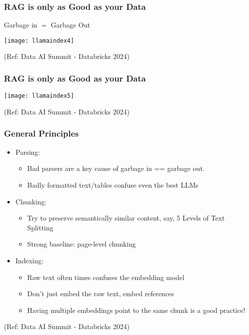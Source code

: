 \begin{frame}[fragile]\frametitle{RAG is only as Good as your Data}

Garbage in $=$ Garbage Out

\begin{center}
\texttt{[image: llamaindex4]}

{\tiny (Ref: Data AI Summit - Databricks 2024)}
\end{center}
\end{frame}


\begin{frame}[fragile]\frametitle{RAG is only as Good as your Data}


\begin{center}
\texttt{[image: llamaindex5]}

{\tiny (Ref: Data AI Summit - Databricks 2024)}
\end{center}
\end{frame}


\begin{frame}[fragile]\frametitle{General Principles}


\begin{itemize}
\item Parsing:
	\begin{itemize}
	\item Bad parsers are a key cause of garbage in == garbage out.
	\item Badly formatted text/tables confuse even the best LLMs
	\end{itemize}	
\item Chunking: 
	\begin{itemize}
	\item Try to preserve semantically similar content, say, 5 Levels of Text Splitting
	\item Strong baseline: page-level chunking
	\end{itemize}	
\item Indexing:
	\begin{itemize}
	\item Raw text often times confuses the embedding model
	\item Don’t just embed the raw text, embed references
	\item Having multiple embeddings point to the same chunk is a good practice! 
	\end{itemize}		
\end{itemize}	

{\tiny (Ref: Data AI Summit - Databricks 2024)}

\end{frame}

